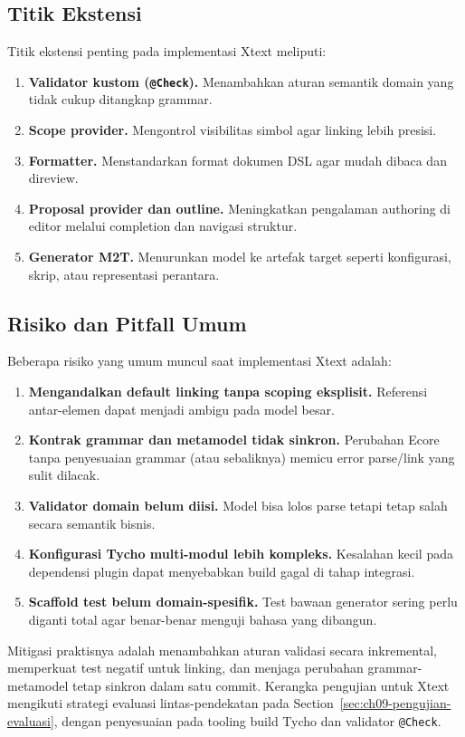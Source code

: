 \subsection{Titik Ekstensi}

Titik ekstensi penting pada implementasi Xtext meliputi:
\begin{enumerate}
  \item \textbf{Validator kustom (\texttt{@Check}).} Menambahkan aturan semantik domain yang tidak cukup ditangkap grammar.
  \item \textbf{Scope provider.} Mengontrol visibilitas simbol agar linking lebih presisi.
  \item \textbf{Formatter.} Menstandarkan format dokumen DSL agar mudah dibaca dan direview.
  \item \textbf{Proposal provider dan outline.} Meningkatkan pengalaman authoring di editor melalui completion dan navigasi struktur.
  \item \textbf{Generator M2T.} Menurunkan model ke artefak target seperti konfigurasi, skrip, atau representasi perantara.
\end{enumerate}

\subsection{Risiko dan Pitfall Umum}

Beberapa risiko yang umum muncul saat implementasi Xtext adalah:
\begin{enumerate}
  \item \textbf{Mengandalkan default linking tanpa scoping eksplisit.} Referensi antar-elemen dapat menjadi ambigu pada model besar.
  \item \textbf{Kontrak grammar dan metamodel tidak sinkron.} Perubahan Ecore tanpa penyesuaian grammar (atau sebaliknya) memicu error parse/link yang sulit dilacak.
  \item \textbf{Validator domain belum diisi.} Model bisa lolos parse tetapi tetap salah secara semantik bisnis.
  \item \textbf{Konfigurasi Tycho multi-modul lebih kompleks.} Kesalahan kecil pada dependensi plugin dapat menyebabkan build gagal di tahap integrasi.
  \item \textbf{Scaffold test belum domain-spesifik.} Test bawaan generator sering perlu diganti total agar benar-benar menguji bahasa yang dibangun.
\end{enumerate}

Mitigasi praktisnya adalah menambahkan aturan validasi secara inkremental, memperkuat test negatif untuk linking, dan menjaga perubahan grammar-metamodel tetap sinkron dalam satu commit.
Kerangka pengujian untuk Xtext mengikuti strategi evaluasi lintas-pendekatan pada Section~\ref{sec:ch09-pengujian-evaluasi}, dengan penyesuaian pada tooling build Tycho dan validator \texttt{@Check}.

